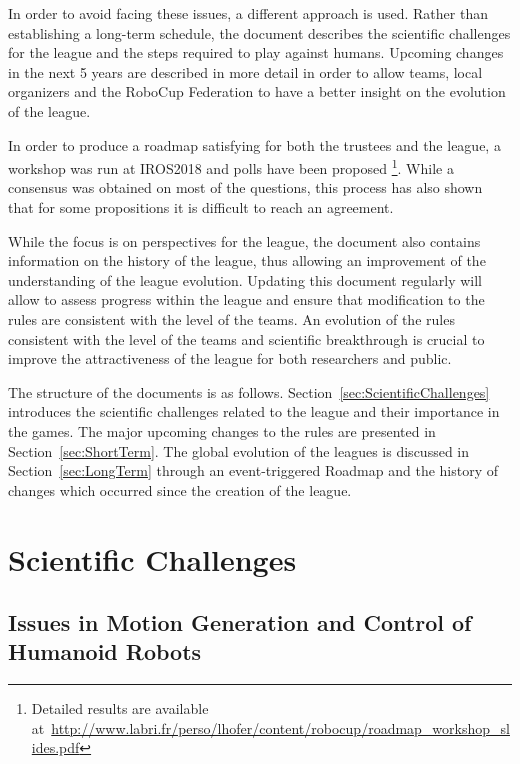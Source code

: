\documentclass{article}
\begin{document}
In order to avoid facing these issues, a different approach is used. Rather than
establishing a long-term schedule, the document describes the scientific challenges
for the league and the steps required to play against humans.
Upcoming changes in the next 5 years are described in more detail in order to allow
teams, local organizers and the RoboCup Federation to have a better insight on
the evolution of the league.

In order to produce a roadmap satisfying for both the trustees and the league,
a workshop was run at IROS2018 and polls have been proposed%
\footnote{Detailed results are available at~\url{http://www.labri.fr/perso/lhofer/content/robocup/roadmap_workshop_slides.pdf}}.
While a consensus was obtained on most of the questions,
this process has also shown that for some propositions it is difficult to reach an agreement.

While the focus is on perspectives for the league,
the document also contains information on the history of the league,
thus allowing an improvement of the understanding of the league evolution.
Updating this document regularly will allow to assess progress within the league
and ensure that modification to the rules are consistent with the level of the
teams.
An evolution of the rules consistent with the level of the teams and
scientific breakthrough is crucial to improve the attractiveness of the league
for both researchers and public.

The structure of the documents is as
follows. Section~\ref{sec:ScientificChallenges} introduces the scientific
challenges related to the league and their importance in the games. The major
upcoming changes to the rules are presented in Section~\ref{sec:ShortTerm}. The
global evolution of the leagues is discussed in Section~\ref{sec:LongTerm}
through an event-triggered Roadmap and the history of changes which occurred
since the creation of the league.

\section{\label{sec:ScientificChallenges}Scientific Challenges}


\subsection{Issues in Motion Generation and Control of Humanoid Robots}
\end{document}
